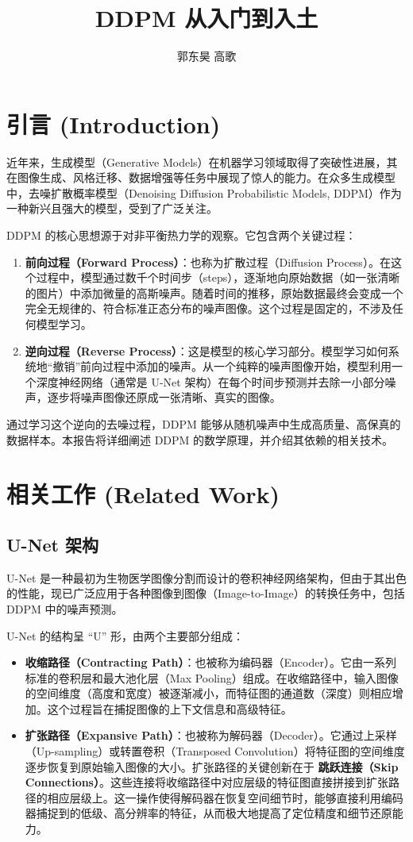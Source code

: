\documentclass{ctexart}
\title{DDPM 从入门到入土}
\author{郭东昊 \quad 高歌}
\begin{document}
\maketitle

\section{引言 (Introduction)}

\noindent
近年来，生成模型（Generative Models）在机器学习领域取得了突破性进展，其在图像生成、风格迁移、数据增强等任务中展现了惊人的能力。在众多生成模型中，去噪扩散概率模型（Denoising Diffusion Probabilistic Models, DDPM）作为一种新兴且强大的模型，受到了广泛关注。

\noindent
DDPM 的核心思想源于对非平衡热力学的观察。它包含两个关键过程：
\begin{enumerate}
    \item \textbf{前向过程（Forward Process）}：也称为扩散过程（Diffusion Process）。在这个过程中，模型通过数千个时间步（steps），逐渐地向原始数据（如一张清晰的图片）中添加微量的高斯噪声。随着时间的推移，原始数据最终会变成一个完全无规律的、符合标准正态分布的噪声图像。这个过程是固定的，不涉及任何模型学习。
    \item \textbf{逆向过程（Reverse Process）}：这是模型的核心学习部分。模型学习如何系统地“撤销”前向过程中添加的噪声。从一个纯粹的噪声图像开始，模型利用一个深度神经网络（通常是 U-Net 架构）在每个时间步预测并去除一小部分噪声，逐步将噪声图像还原成一张清晰、真实的图像。
\end{enumerate}
通过学习这个逆向的去噪过程，DDPM 能够从随机噪声中生成高质量、高保真的数据样本。本报告将详细阐述 DDPM 的数学原理，并介绍其依赖的相关技术。

\section{相关工作 (Related Work)}

\subsection{U-Net 架构}
\noindent
U-Net 是一种最初为生物医学图像分割而设计的卷积神经网络架构，但由于其出色的性能，现已广泛应用于各种图像到图像（Image-to-Image）的转换任务中，包括 DDPM 中的噪声预测。

\noindent
U-Net 的结构呈 “U” 形，由两个主要部分组成：
\begin{itemize}
    \item \textbf{收缩路径（Contracting Path）}：也被称为编码器（Encoder）。它由一系列标准的卷积层和最大池化层（Max Pooling）组成。在收缩路径中，输入图像的空间维度（高度和宽度）被逐渐减小，而特征图的通道数（深度）则相应增加。这个过程旨在捕捉图像的上下文信息和高级特征。
    \item \textbf{扩张路径（Expansive Path）}：也被称为解码器（Decoder）。它通过上采样（Up-sampling）或转置卷积（Transposed Convolution）将特征图的空间维度逐步恢复到原始输入图像的大小。扩张路径的关键创新在于 \textbf{跳跃连接（Skip Connections）}。这些连接将收缩路径中对应层级的特征图直接拼接到扩张路径的相应层级上。这一操作使得解码器在恢复空间细节时，能够直接利用编码器捕捉到的低级、高分辨率的特征，从而极大地提高了定位精度和细节还原能力。
\end{itemize}
\end{document}
